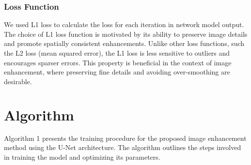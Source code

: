 \documentclass{article}
\begin{document}
\subsubsection{Loss Function}
We used L1 loss to calculate the loss for each iteration in network model output. The choice of L1 loss function is motivated by its ability to preserve image details and promote spatially consistent enhancements. Unlike other loss functions, such the L2 loss (mean squared error), the L1 loss is less sensitive to outliers and encourages sparser errors. This property is beneficial in the context of image enhancement, where preserving fine details and avoiding over-smoothing are desirable.
\section{Algorithm}

Algorithm 1 presents the training procedure for the proposed image enhancement method using the U-Net architecture. The algorithm outlines the steps involved in training the model and optimizing its parameters.
\end{document}
